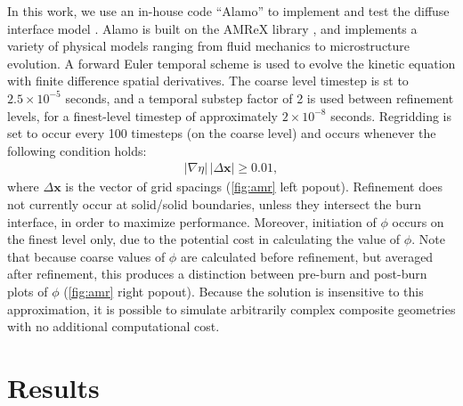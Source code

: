 \documentclass[colorinlistoftodos,review]{elsarticle}
\begin{document}
In this work, we use an in-house code ``Alamo'' to implement and test the diffuse interface model \cite{runnels2021massively}.
Alamo is built on the AMReX library \cite{zhang2019amrex}, and implements a variety of physical models ranging from fluid mechanics to microstructure evolution.
A forward Euler temporal scheme is used to evolve the kinetic equation with finite difference spatial derivatives.
The coarse level timestep is st to $2.5\times10^{-5}$ seconds, and a temporal substep factor of 2 is used between refinement levels, for a finest-level timestep of approximately $2\times10^{-8}$ seconds.
Regridding is set to occur every 100 timesteps (on the coarse level) and occurs whenever the following condition holds:
\begin{align}
  |\nabla \eta|\,|\Delta \bm{x}| \ge 0.01,
\end{align}
where $\Delta\bm{x}$ is the vector of grid spacings (\cref{fig:amr} left popout).
Refinement does not currently occur at solid/solid boundaries, unless they intersect the burn interface, in order to maximize performance.
Moreover, initiation of $\phi$ occurs on the finest level only, due to the potential cost in calculating the value of $\phi$.
Note that because coarse values of $\phi$ are calculated before refinement, but averaged after refinement, this produces a distinction between pre-burn and post-burn plots of $\phi$ (\cref{fig:amr} right popout).
Because the solution is insensitive to this approximation, it is possible to simulate arbitrarily complex composite geometries with no additional computational cost.

\section{Results} \label{Results} 
\end{document}
